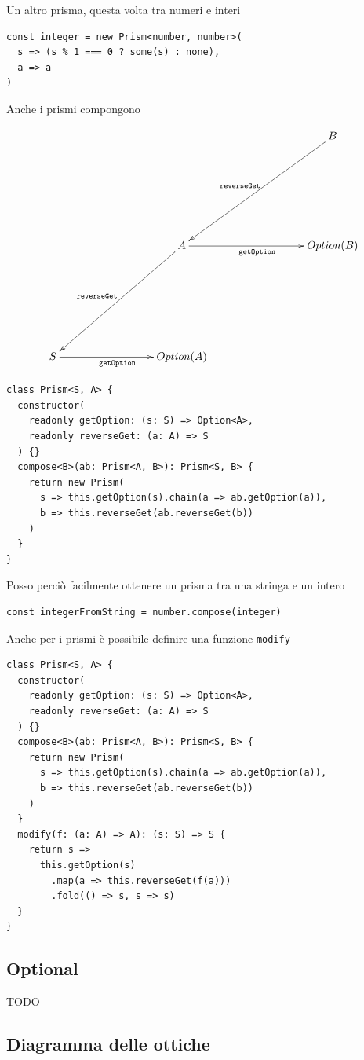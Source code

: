 \documentclass[12pt]{article}
\begin{document}
Un altro prisma, questa volta tra numeri e interi

\begin{verbatim}
const integer = new Prism<number, number>(
  s => (s % 1 === 0 ? some(s) : none),
  a => a
)
\end{verbatim}

Anche i prismi compongono

\[
\xymatrixrowsep{3cm}
\xymatrixcolsep{3cm}
\xymatrix{
  & & B \ar[dl]_{\texttt{reverseGet}} \\
  & A \ar[dl]_{\texttt{reverseGet}} \ar[r]_{\texttt{getOption}} & {Option(B)} \\
  S \ar[r]_{\texttt{getOption}} & {Option(A)}
}
\]

\begin{verbatim}
class Prism<S, A> {
  constructor(
    readonly getOption: (s: S) => Option<A>,
    readonly reverseGet: (a: A) => S
  ) {}
  compose<B>(ab: Prism<A, B>): Prism<S, B> {
    return new Prism(
      s => this.getOption(s).chain(a => ab.getOption(a)),
      b => this.reverseGet(ab.reverseGet(b))
    )
  }
}
\end{verbatim}

Posso perciò facilmente ottenere un prisma tra una stringa e un intero

\begin{verbatim}
const integerFromString = number.compose(integer)
\end{verbatim}

Anche per i prismi è possibile definire una funzione \texttt{modify}

\begin{verbatim}
class Prism<S, A> {
  constructor(
    readonly getOption: (s: S) => Option<A>,
    readonly reverseGet: (a: A) => S
  ) {}
  compose<B>(ab: Prism<A, B>): Prism<S, B> {
    return new Prism(
      s => this.getOption(s).chain(a => ab.getOption(a)),
      b => this.reverseGet(ab.reverseGet(b))
    )
  }
  modify(f: (a: A) => A): (s: S) => S {
    return s =>
      this.getOption(s)
        .map(a => this.reverseGet(f(a)))
        .fold(() => s, s => s)
  }
}
\end{verbatim}

\subsection{Optional}

TODO

\subsection{Diagramma delle ottiche}
\end{document}
